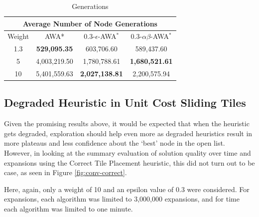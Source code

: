\begin{table}
\def\arraystretch{1.3}
\begin{tabular}{ |c||c|c|c|  }
    \hline
    \multicolumn{4}{|c|}{Average Number of Node Generations} \\
    \hline
    Weight& AWA* & $0.3$-$\epsilon$-AWA$^*$ & $0.3$-$\alpha\beta$-AWA$^*$\\
    \hline
    1.3 & \textbf{529,095.35} & 603,706.60 & 589,437.60 \\
    \hline
    5 & 4,003,219.50 & 1,780,788.61 & \textbf{1,680,521.61} \\
    \hline
    10& 5,401,559.63 & \textbf{2,027,138.81} & 2,200,575.94 \\
    \hline
\end{tabular}
\caption{Generations}\label{tab:inv-avg-gen}
\end{table}

\subsection{Degraded Heuristic in Unit Cost Sliding Tiles}
Given the promising results above, it would be expected that when the heuristic gets degraded, exploration should help even more as degraded heuristics result in more plateaus and less confidence about the `best' node in the open list. However, in looking at the summary evaluation of solution quality over time and expansions using the Correct Tile Placement heuristic, this did not turn out to be case, as seen in Figure \ref{fig:conv-correct}.

Here, again, only a weight of 10 and an epsilon value of 0.3 were considered. For expansions, each algorithm was limited to 3,000,000 expansions, and for time each algorithm was limited to one minute. 

